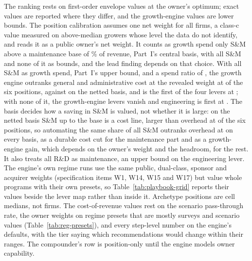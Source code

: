 The ranking rests on first-order envelope values at the owner's optimum; exact values are reported where they differ, and the growth-engine values are lower bounds. The position calibration assumes one net weight for all firms, a class-c value measured on above-median growers whose level the data do not identify, and reads it as a public owner's net weight. It counts as growth spend only S\&M above a maintenance base of \pbMaintBase\% of revenue, Part~I's central basis, with all S\&M and none of it as bounds, and the lead finding depends on that choice. With all S\&M as growth spend, Part~I's upper bound, and a spend ratio of \SpendRatioPBAll, the growth engine outranks general and administrative cost at the revealed weight at \pbNGEAheadGAAll{} of the six positions, against \pbNGEAheadGANet{} on the netted basis, and is the first of the four levers at \pbNGEFirstRevAll; with none of it, the growth-engine levers vanish and engineering is first at \pbNEngFirstRevNone. The basis decides how a saving in S\&M is valued, not whether it is large: on the netted basis S\&M up to the base is a cost line, larger than overhead at \pbNSMMaintAboveGA{} of the six positions, so automating the same share of all S\&M outranks overhead at \pbNSMAutoAheadGA{} on every basis, as a durable cost cut for the maintenance part and as a growth-engine gain, which depends on the owner's weight and the headroom, for the rest. It also treats all R\&D as maintenance, an upper bound on the engineering lever. The engine's own regime runs use the same public, dual-class, sponsor and acquirer weights (specification items W1, W14, W15 and W17) but value whole programs with their own presets, so Table~\ref{tab:playbook-grid} reports their values beside the lever map rather than inside it. Archetype positions are cell medians, not firms. The cost-of-revenue values rest on the scenario pass-through rate, the owner weights on regime presets that are mostly surveys and scenario values (Table~\ref{tab:reg-presets}), and every step-level number on the engine's defaults, with the tier saying which recommendations would change within their ranges. The compounder's row is position-only until the engine models owner capability.
